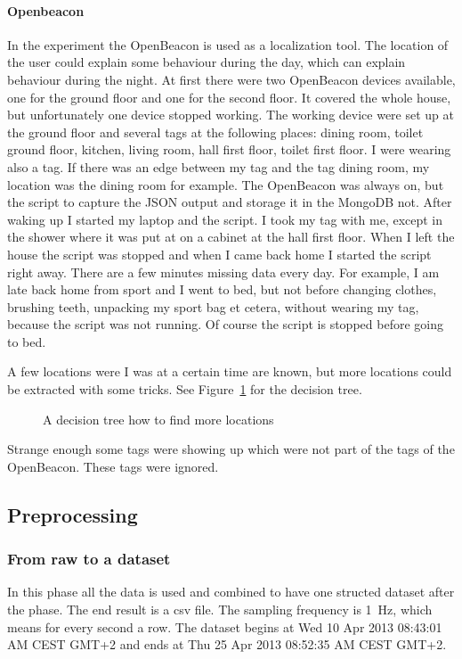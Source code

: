 		\paragraph{Openbeacon}
			In the experiment the OpenBeacon is used as a localization tool. The location of the user could explain some behaviour during the day, which can explain behaviour during the night. At first there were two OpenBeacon devices available, one for the ground floor and one for the second floor. It covered the whole house, but unfortunately one device stopped working. The working device were set up at the ground floor and several tags at the following places: dining room, toilet ground floor, kitchen, living room, hall first floor, toilet first floor. I were wearing also a tag. If there was an edge between my tag and the tag dining room, my location was the dining room for example. The OpenBeacon was always on, but the script to capture the JSON output and storage it in the MongoDB not. After waking up I started my laptop and the script. I took my tag with me, except in the shower where it was put at on a cabinet at the hall first floor. When I left the house the script was stopped and when I came back home I started the script right away. There are a few minutes missing data every day. For example, I am late back home from sport and I went to bed, but not before changing clothes, brushing teeth, unpacking my sport bag et cetera, without wearing my tag, because the script was not running. Of course the script is stopped before going to bed.
			
			A few locations were I was at a certain time are known, but more locations could be extracted with some tricks. See Figure~\ref{fig:decisiontree} for the decision tree.

				\begin{figure}[h!]
					
					\caption{A decision tree how to find more locations}
					\label{fig:decisiontree}
				\end{figure}

				Strange enough some tags were showing up which were not part of the tags of the OpenBeacon. These tags were ignored.
		
		\clearpage
		
				
	\subsection{Preprocessing}
		\label{sec:preprocessing}
		\subsubsection{From raw to a dataset}
			\label{sec:rawdataset}
			In this phase all the data is used and combined to have one structed dataset after the phase. The end result is a csv file. The sampling frequency is \SI{1}{\hertz}, which means for every second a row. The dataset begins at Wed 10 Apr 2013 08:43:01 AM CEST GMT+2 and ends at Thu 25 Apr 2013 08:52:35 AM CEST GMT+2. 
			
